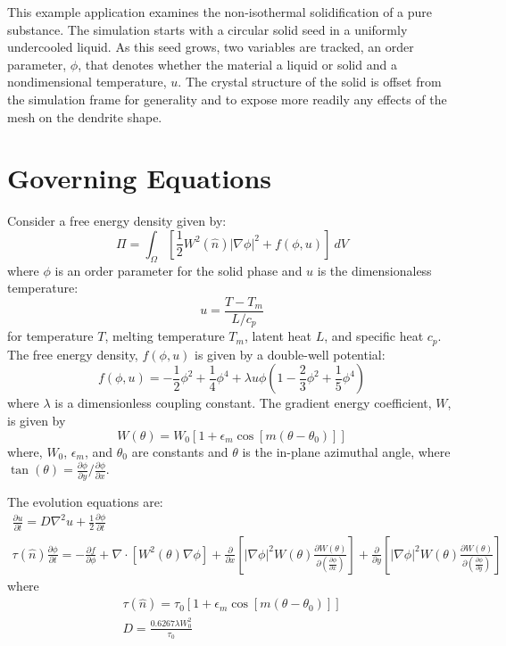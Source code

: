 \documentclass[10pt]{article}
\begin{document}
This example application examines the non-isothermal solidification of a pure substance. The simulation starts with a circular solid seed in a uniformly undercooled liquid. As this seed grows, two variables are tracked, an order parameter, $\phi$, that denotes whether the material a liquid or solid and a nondimensional temperature,  $u$. The crystal structure of the solid is offset from the simulation frame for generality and to expose more readily any effects of the mesh on the dendrite shape.

\section{Governing Equations}

Consider a free energy density given by:
\begin{equation}
  \Pi = \int_{\Omega}   \left[ \frac{1}{2} W^2(\hat{n})|\nabla \phi|^2+f(\phi,u) \right]   ~dV 
\end{equation}
where $\phi$ is an order parameter for the solid phase and $u$ is the dimensionaless temperature:
\begin{equation}
u = \frac{T - T_m}{L/c_p}
\end{equation}
for temperature $T$, melting temperature $T_m$, latent heat $L$, and specific heat $c_p$. The free energy density, $f(\phi,u)$ is given by a double-well potential:
\begin{equation}
f(\phi,u) = -\frac{1}{2}\phi^2 + \frac{1}{4}\phi^4 + \lambda u \phi \left(1-\frac{2}{3} \phi^2+\frac{1}{5}\phi^4 \right)
\end{equation}
where $\lambda$ is a dimensionless coupling constant. The gradient energy coefficient, $W$, is given by 
\begin{equation}
W(\theta) = W_0 [1+\epsilon_m \cos[m(\theta-\theta_0)]]
\end{equation}
where, $W_0$, $\epsilon_m$, and $\theta_0$ are constants and $\theta$ is the in-plane azimuthal angle, where $\tan(\theta) = \frac{\partial \phi}{\partial y} / \frac{\partial \phi}{\partial x}$.

The evolution equations are:
\begin{gather}
\frac{\partial u}{\partial t} = D \nabla^2 u + \frac{1}{2}  \frac{\partial \phi}{\partial t} \\
\tau(\hat{n}) \frac{\partial \phi}{\partial t} = -\frac{\partial f}{\partial \phi} + \nabla \cdot \left[W^2(\theta) \nabla \phi \right]+  \frac{\partial}{\partial x} \left[ |\nabla \phi|^2 W(\theta) \frac{\partial W(\theta)}{\partial \left( \frac{\partial \phi}{\partial x} \right)} \right] + \frac{\partial}{\partial y} \left[ |\nabla \phi|^2 W(\theta) \frac{\partial W(\theta)}{\partial \left( \frac{\partial \phi}{\partial y} \right)} \right] 
\end{gather}
where
\begin{gather}
\tau(\hat{n}) = \tau_0 [1+\epsilon_m \cos[m(\theta-\theta_0)]] \\
D = \frac{0.6267 \lambda W_0^2}{\tau_0}
\end{gather}
\end{document}
